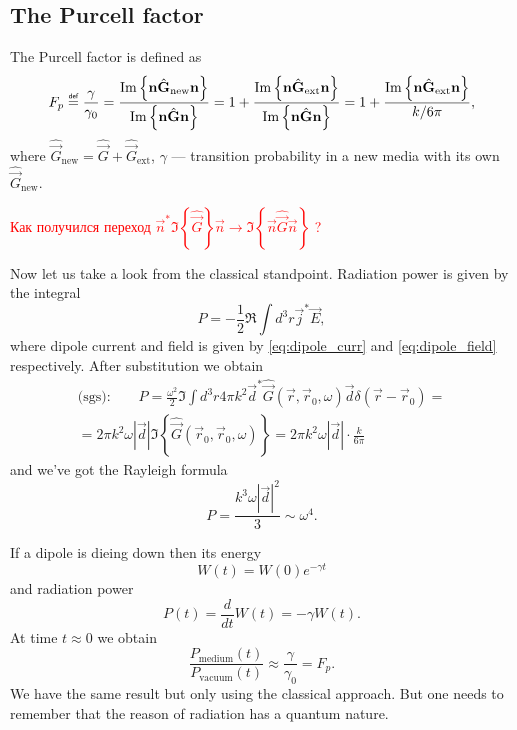 \subsection{The Purcell factor}

The Purcell factor is defined as 
\begin{equation}
	F_p \myeq \frac{\gamma}{\gamma_0} = \frac{\Im \left\{\vec{n} \hat{\vec{G}}_{\text{new}} \vec{n}\right\}}{\Im \left\{\vec{n} \hat{\vec{G}} \vec{n}\right\}} = 1 + \frac{\Im \left\{\vec{n} \hat{\vec{G}}_{\text{ext}} \vec{n}\right\}}{\Im \left\{\vec{n} \hat{\vec{G}} \vec{n}\right\}} = 1 + \frac{\Im \left\{\vec{n} \hat{\vec{G}}_{\text{ext}} \vec{n}\right\}}{k / 6\pi},
\end{equation}
where $\hat{\vec{G}}_{\text{new}} = \hat{\vec{G}} + \hat{\vec{G}}_{\text{ext}}$, $\gamma$ --- transition probability in a new media with its own $\hat{\vec{G}}_{\text{new}}$.

\begin{otherlanguage}{russian}	
	\textcolor{red}{Как получился переход $ \vec{n}^* \Im \left\{ \hat{\vec{G}}  \right\} \vec{n} \to \Im \left\{\vec{n} \hat{\vec{G}} \vec{n} \right\}$ ?} 
\end{otherlanguage}

Now let us take a look from the classical standpoint. Radiation power is given by the integral
\begin{equation}
	P = - \frac{1}{2} \Re \int d^3 r \vec{j}^* \vec{E},
\end{equation}
where dipole current and field is given by \eqref{eq:dipole_curr} and \eqref{eq:dipole_field} respectively. After substitution we obtain
\begin{multline}
	\text{(sgs):} \qquad P = \frac{\omega^2}{2} \Im \int d^3 r 4 \pi k^2 \vec{d}^* \hat{\vec{G}}(\vec{r}, \vec{r}_0, \omega) \vec{d} \delta(\vec{r} - \vec{r}_0) =\\= 2 \pi k^2 \omega |\vec{d}| \Im \left\{ \hat{\vec{G}} (\vec{r}_0, \vec{r}_0, \omega) \right\} = 2 \pi k^2 \omega |\vec{d}| \cdot \frac{k}{6 \pi}
\end{multline} 
and we've got the Rayleigh formula
\begin{equation}
	P = \frac{k^3 \omega |\vec{d}|^2}{3} \sim \omega^4.
\end{equation}

If a dipole is dieing  down then its energy
\begin{equation}
	W(t) = W(0) e^{- \gamma t}
\end{equation}
and radiation power
\begin{equation}
	P(t) = \frac{d}{dt} W(t) = - \gamma W(t).
\end{equation}
At time $t \approx 0$ we obtain
\begin{equation}
	\frac{P_{\text{medium}}(t)}{P_{\text{vacuum}}(t)} \approx \frac{\gamma}{\gamma_0} = F_p.
\end{equation}
We have the same result but only using the classical approach. But one needs to remember that the reason of radiation has a quantum nature.